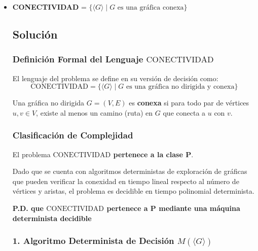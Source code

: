 \begin{itemize}[leftmargin=*]
    \vspace{0.5cm}
    \item \textbf{CONECTIVIDAD} = $\{ \langle G \rangle \mid G \text{ es una gráfica conexa} \}$
    
    \subsection*{Solución}
    \subsubsection*{Definición Formal del Lenguaje $\text{CONECTIVIDAD}$}

    El lenguaje del problema se define en su versión de decisión como:
    \[ \text{CONECTIVIDAD} = \{ \langle G \rangle \mid G \text{ es una gráfica no dirigida y conexa} \} \]

    Una gráfica no dirigida $G = (V, E)$ es \textbf{conexa} si para todo par de vértices $u, v \in V$, existe al menos un camino (ruta) en $G$ que conecta a $u$ con $v$.

    \subsubsection*{Clasificación de Complejidad}

    El problema \textbf{$\text{CONECTIVIDAD}$ pertenece a la clase $\mathbf{P}$}. 

    Dado que se cuenta con algoritmos deterministas de exploración de gráficas que pueden verificar la conexidad en tiempo lineal respecto al número de vértices y aristas, el problema es decidible en tiempo polinomial determinista.

    \vspace{0.3cm}
    \noindent\textbf{P.D. que $\text{CONECTIVIDAD}$ pertenece a P mediante una máquina determinista decidible}

    \subsubsection*{1. Algoritmo Determinista de Decisión $M(\langle G \rangle)$}


\end{itemize}
